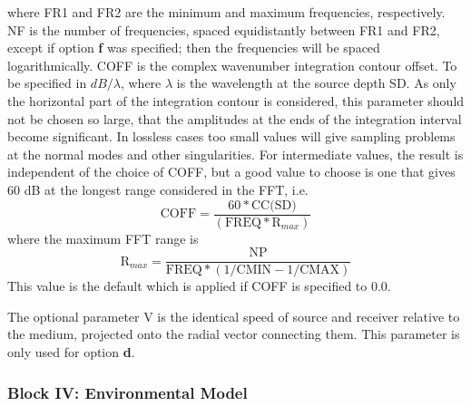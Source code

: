 where FR1 and FR2 are the minimum and maximum frequencies, respectively.
NF is the number of frequencies, spaced equidistantly between FR1
and FR2, except if option {\bf f} was specified; then the frequencies
will be spaced logarithmically. COFF is the complex wavenumber
integration 
contour offset. To be specified in
		$dB/\lambda$, where $\lambda$ is the wavelength at the source 
		depth SD. As only the horizontal part of
		the integration contour is considered, this parameter
		should not be chosen so large, that the amplitudes
		at the ends of the integration interval become 
		significant. In lossless cases too small values
		will give sampling problems at the normal modes
		and other singularities. For intermediate values,
		the result is independent of the choice of COFF,
		but a good value to choose is one that gives 60 dB
		at the longest range considered in the FFT, i.e.
                \begin{displaymath}
		\mbox{COFF} = \frac{60 \ast \mbox{CC(SD)}}{( \mbox{FREQ} \ast \mbox{R}_{max} )}
		\end{displaymath} 
       		where the maximum FFT range is
       		\begin{displaymath}
		\mbox{R}_{max} = \frac{\mbox{NP}}{\mbox{FREQ}\ast(1/\mbox{CMIN} - 1/\mbox{CMAX})}
		\end{displaymath}
		This value is the default which is applied if COFF
		is specified to 0.0.

The optional parameter V is the identical speed of source and receiver
relative to the medium, 
projected onto the radial vector connecting them.
This parameter is only used for option {\bf d}.

\subsubsection{Block IV: Environmental Model}

